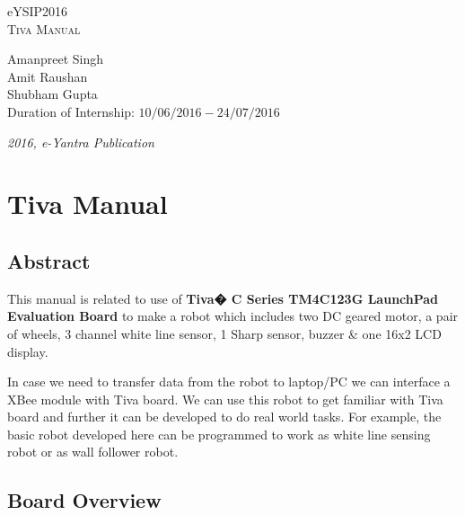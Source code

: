 \documentclass[a4paper,12pt,oneside]{book}
\begin{document}
\begin{titlepage}
\raggedright
{\Large eYSIP2016\\[1cm]}
{\Huge\scshape Tiva Manual\\[.1in]}
\vfill
\begin{flushright}
{\large Amanpreet Singh \\}
{\large Amit Raushan \\}
{\large Shubham Gupta \\}
{\large Duration of Internship: $ 10/06/2016-24/07/2016 $ \\}
\end{flushright}

{\itshape 2016, e-Yantra Publication}

\end{titlepage}

\tableofcontents


\chapter[Tiva Manual]{Tiva Manual}
\section{Abstract}

This manual is related to use of \textbf{Tiva� C Series TM4C123G LaunchPad Evaluation Board} to make a robot which includes two DC geared motor, a pair of wheels, 3 channel white line sensor, 1 Sharp sensor, buzzer \& one 16x2 LCD display.\par
In case we need to transfer data from the robot to laptop/PC we can interface a XBee module with Tiva board. We can use this robot to get familiar with Tiva board and further it can be developed to do real world tasks. For example, the basic  robot developed here can be programmed to work as white line sensing robot or as wall follower robot.
\newpage
\section{Board Overview}
\end{document}
